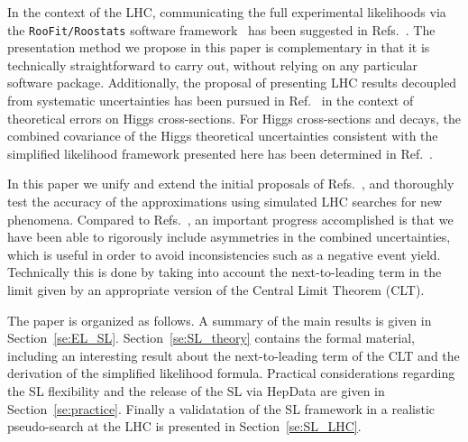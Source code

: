 \documentclass[11pt]{article}
\begin{document}
In the context of the LHC, communicating the full experimental likelihoods via the \texttt{RooFit/Roostats} software framework~\cite{Verkerke:2003ir,Moneta:2010pm} has been suggested in Refs.~\cite{Kraml:2012sg,Boudjema:2013qla}. The presentation method we propose in this paper is complementary in that it is technically straightforward to carry out, without relying on any
particular software package. Additionally, the proposal of presenting LHC results decoupled from systematic uncertainties has been pursued in Ref.~\cite{Cranmer:2013hia} in the context of theoretical errors on Higgs cross-sections. For Higgs cross-sections and decays, the combined covariance of the Higgs theoretical uncertainties consistent with the simplified likelihood framework presented here has been determined in Ref.~\cite{Arbey:2016kqi}.

In this paper we unify and extend the initial proposals of Refs.~\cite{Fichet:2016gvx,SL_note}, and thoroughly test the accuracy of the approximations using simulated LHC searches for new phenomena.
Compared to Refs.~\cite{Fichet:2016gvx,SL_note}, an important progress accomplished is that we have been able to rigorously include asymmetries in the combined uncertainties, which is useful in order to avoid inconsistencies such as a negative event yield. Technically this is done by taking into account the next-to-leading term in the limit given by an appropriate version of the Central Limit Theorem (CLT).

The paper is organized as follows. A summary of the main results is given in Section~\ref{se:EL_SL}. Section~\ref{se:SL_theory} contains the formal material, including
an interesting result about the next-to-leading term of the CLT and the derivation of the simplified likelihood formula.
Practical considerations regarding the SL flexibility and the  release of the SL via HepData are given in 
Section~\ref{se:practice}.
Finally a validatation of the SL framework in a realistic pseudo-search at the LHC  is presented in  Section~\ref{se:SL_LHC}. 
 

\end{document}
